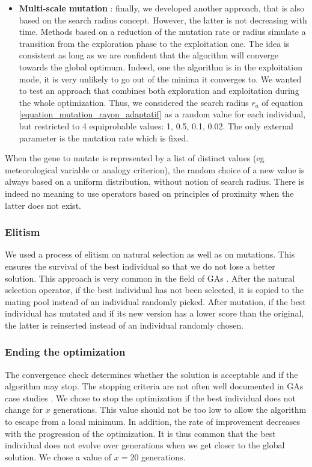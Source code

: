 \documentclass[twocol]{ametsoc}
\begin{document}
\begin{itemize}
	\item \textbf{Multi-scale mutation} \citep{Horton2012a}: finally, we developed another approach, that is also based on the search radius concept. However, the latter is not decreasing with time. Methods based on a reduction of the mutation rate or radius simulate a transition from the exploration phase to the exploitation one. The idea is consistent as long as we are confident that the algorithm will converge towards the global optimum. Indeed, one the algorithm is in the exploitation mode, it is very unlikely to go out of the minima it converges to. We wanted to test an approach that combines both exploration and exploitation during the whole optimization. Thus, we considered the search radius $r_{a}$ of equation \ref{equation_mutation_rayon_adaptatif} as a random value for each individual, but restricted to 4 equiprobable values: 1, 0.5, 0.1, 0.02. The only external parameter is the mutation rate which is fixed.


\end{itemize}

When the gene to mutate is represented by a list of distinct values (eg meteorological variable or analogy criterion), the random choice of a new value is always based on a uniform distribution, without notion of search radius. There is indeed no meaning to use operators based on principles of proximity when the latter does not exist.


\subsubsection{Elitism}

We used a process of elitism on natural selection as well as on mutations. This ensures the survival of the best individual so that we do not lose a better solution. This approach is very common in the field of GAs \citep{Haupt2004}. After the natural selection operator, if the best individual has not been selected, it is copied to the mating pool instead of an individual randomly picked. After mutation, if the best individual has mutated and if its new version has a lower score than the original, the latter is reinserted instead of an individual randomly chosen.


\subsubsection{Ending the optimization}

The convergence check determines whether the solution is acceptable and if the algorithm may stop. The stopping criteria are not often well documented in GAs case studies \citep{Haupt2004}. We chose to stop the optimization if the best individual does not change for $x$ generations. This value should not be too low to allow the algorithm to escape from a local minimum. In addition, the rate of improvement decreases with the progression of the optimization. It is thus common that the best individual does not evolve over generations when we get closer to the global solution. We chose a value of $x=20$ generations.
\end{document}
